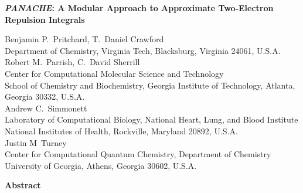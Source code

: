 \documentclass[12pt,letterpaper]{article}
\newcommand{\panache}{\textit{PANACHE}\xspace}
\begin{document}
\begin{center}
\large\textbf{\panache: A Modular Approach to Approximate Two-Electron Repulsion Integrals}
%
\vspace*{2ex}

\normalfont
\normalsize
%
Benjamin P.\ Pritchard, T.\ Daniel Crawford\\
{Department of Chemistry, Virginia Tech, Blacksburg, Virginia 24061, U.S.A.}\\
\vspace{2ex}
Robert M.\ Parrish, C.\ David Sherrill\\
{Center for Computational Molecular Science and Technology \\
School of Chemistry and Biochemistry, Georgia Institute of Technology, Atlanta, Georgia 30332, U.S.A.}\\
\vspace{2ex}
Andrew C.\ Simmonett \\
{Laboratory of Computational Biology, National Heart, Lung, and Blood Institute\\
National Institutes of Health, Rockville, Maryland 20892, U.S.A.}\\
\vspace{2ex}
Justin M\ Turney\\
{Center for Computational Quantum Chemistry, Department of Chemistry \\
University of Georgia, Athens, Georgia 30602, U.S.A.} \\

\date{\today}
\end{center}


\doublespacing


\begin{center}
\textbf{Abstract}
\end{center}
\end{document}
